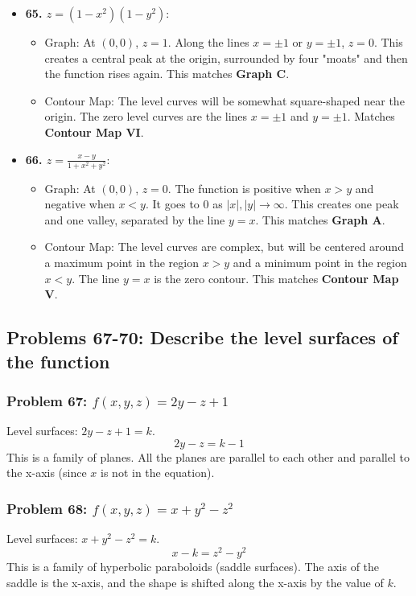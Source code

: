 \documentclass{article}
\begin{document}
\begin{itemize}
    \item \textbf{65. $z = (1-x^2)(1-y^2)$}:
    \begin{itemize}
        \item Graph: At $(0,0)$, $z=1$. Along the lines $x=\pm 1$ or $y=\pm 1$, $z=0$. This creates a central peak at the origin, surrounded by four "moats" and then the function rises again. This matches \textbf{Graph C}.
        \item Contour Map: The level curves will be somewhat square-shaped near the origin. The zero level curves are the lines $x=\pm 1$ and $y=\pm 1$. Matches \textbf{Contour Map VI}.
    \end{itemize}
    
    \item \textbf{66. $z = \frac{x-y}{1+x^2+y^2}$}:
    \begin{itemize}
        \item Graph: At $(0,0)$, $z=0$. The function is positive when $x>y$ and negative when $x<y$. It goes to 0 as $|x|,|y| \to \infty$. This creates one peak and one valley, separated by the line $y=x$. This matches \textbf{Graph A}.
        \item Contour Map: The level curves are complex, but will be centered around a maximum point in the region $x>y$ and a minimum point in the region $x<y$. The line $y=x$ is the zero contour. This matches \textbf{Contour Map V}.
    \end{itemize}
\end{itemize}

\subsection{Problems 67-70: Describe the level surfaces of the function}

\subsubsection{Problem 67: $f(x, y, z) = 2y - z + 1$}
Level surfaces: $2y - z + 1 = k$.
\[ 2y - z = k - 1 \]
This is a family of planes. All the planes are parallel to each other and parallel to the x-axis (since $x$ is not in the equation).

\subsubsection{Problem 68: $f(x, y, z) = x + y^2 - z^2$}
Level surfaces: $x + y^2 - z^2 = k$.
\[ x - k = z^2 - y^2 \]
This is a family of hyperbolic paraboloids (saddle surfaces). The axis of the saddle is the x-axis, and the shape is shifted along the x-axis by the value of $k$.
\end{document}
